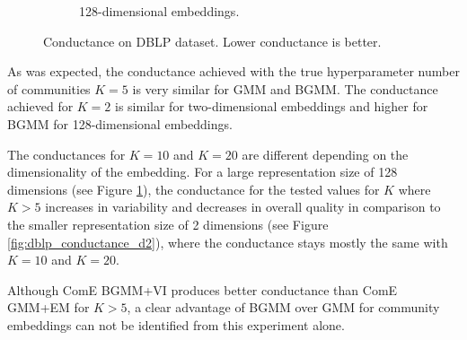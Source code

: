 \documentclass[conference]{IEEEtran}
\begin{document}
\begin{figure}[H]
\begin{subfigure}{.5\linewidth}
        \caption{128-dimensional embeddings.}
        \label{fig:dblp_conductance_d128}
    \end{subfigure}

    \caption{Conductance on DBLP dataset. Lower conductance is better.}
    \label{fig:dblp_conductance}
\end{figure}

As was expected, the conductance achieved with the true hyperparameter number of communities $K=5$ is very similar for GMM and BGMM. The conductance achieved for $K=2$ is similar for two-dimensional embeddings and higher for BGMM for 128-dimensional embeddings.

The conductances for $K=10$ and $K=20$ are different depending on the dimensionality of the embedding. For a large representation size of 128 dimensions (see Figure \ref{fig:dblp_conductance_d128}), the conductance for the tested values for $K$ where $K>5$ increases in variability and decreases in overall quality in comparison to the smaller representation size of 2 dimensions (see Figure \ref{fig:dblp_conductance_d2}), where the conductance stays mostly the same with $K=10$ and $K=20$.

Although ComE BGMM+VI produces better conductance than ComE GMM+EM for $K>5$, a clear advantage of BGMM over GMM for community embeddings can not be identified from this experiment alone.
\end{document}
